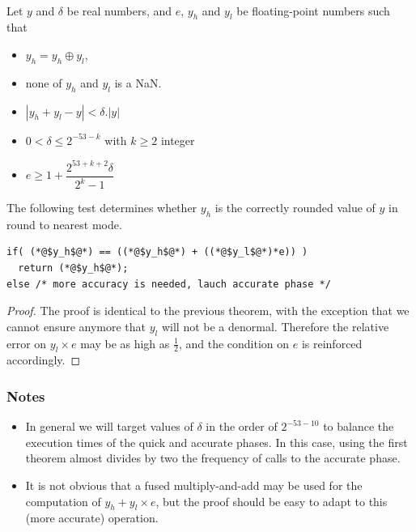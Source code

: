 \begin{theorem}
\label{th:roundingRN2}
~\\
  Let $y$ and $\delta$ be real numbers, and $e$, $y_h$ and $y_l$ be
  floating-point numbers such that 
  \begin{itemize}
  \item $y_h=y_h\oplus y_l$,
  \item none of $y_h$ and $y_l$ is a  NaN.
  \item $|y_h+y_l - y| < \delta.|y|$
  \item $0< \delta \le 2^{-53-k}$ with $k\ge 2$ integer
  \item $e\ge 1+  \dfrac{2^{53+k+2}\delta}{2^{k}-1}$
\end{itemize}

The following test determines whether $y_h$ is the
  correctly rounded value of $y$ in  round to nearest mode.

\begin{lstlisting}[firstnumber=1,caption={Test for rounding to the nearest}]
if( (*@$y_h$@*) == ((*@$y_h$@*) + ((*@$y_l$@*)*e)) )
  return (*@$y_h$@*);
else /* more accuracy is needed, lauch accurate phase */
\end{lstlisting}
\end{theorem}

\begin{proof}
  The proof is identical to the previous theorem, with the exception
  that we cannot ensure anymore that $y_l$ will not be a denormal.
  Therefore the relative error on $y_l\times e$ may be as high as
  $\frac{1}{2}$, and the condition on $e$ is reinforced accordingly.
\end{proof}


\subsubsection*{Notes}

\begin{itemize}
\item In general we will target values of $\delta$ in the order of
  $2^{-53-10}$ to balance the execution times of the quick and
  accurate phases. In this case, using the first theorem almost divides
  by two the frequency of calls to the accurate phase. 
\item It is not obvious that a fused multiply-and-add may be used for
  the computation of $y_h+y_l\times e$, but the proof should be easy
  to adapt to this (more accurate) operation.
\end{itemize}




